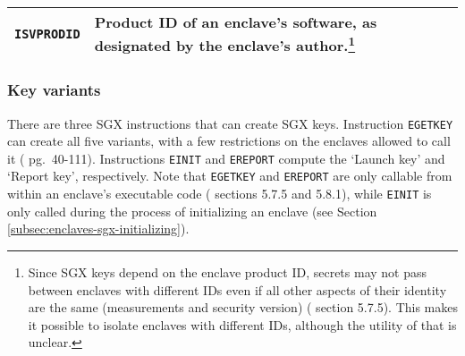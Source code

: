 \begin{tabularx}{\textwidth}{|l|X|}
\hline
    {\tt ISVPRODID} & Product ID of an enclave's software, as designated by the enclave's author.\footnote{Since SGX keys depend on the enclave product ID, secrets may not pass between enclaves with different IDs even if all other aspects of their identity are the same (measurements and security version) (\cite{intel-sgx-explained-advanced} section 5.7.5). This makes it possible to isolate enclaves with different IDs, although the utility of that is unclear.} \\
\hline
\end{tabularx}

\subsubsection{Key variants}

There are three SGX instructions that can create SGX keys. Instruction {\tt EGETKEY} can create all five variants, with a few restrictions on the enclaves allowed to call it (\cite{sgx-manual} pg.\ 40-111). Instructions {\tt EINIT} and {\tt EREPORT} compute the `Launch key' and `Report key', respectively. Note that {\tt EGETKEY} and {\tt EREPORT} are only callable from within an enclave's executable code (\cite{intel-sgx-explained-advanced} sections 5.7.5 and 5.8.1), while {\tt EINIT} is only called during the process of initializing an enclave (see Section \ref{subsec:enclaves-sgx-initializing}).

